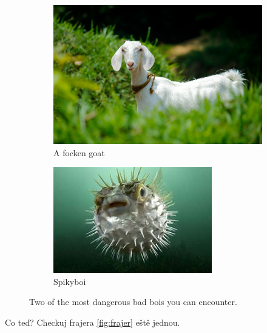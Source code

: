\documentclass{article}
\begin{document}
	\begin{figure}[h!]
		\centering
		\begin{subfigure}[b]{0.4\linewidth}
			\includegraphics[width=\linewidth]{images/goat.jpg}
			\caption{A focken goat}
		\end{subfigure}
		\begin{subfigure}[b]{0.4\linewidth}
			\includegraphics[width=\linewidth]{images/spikyboi.jpeg}
			\caption{Spikyboi}
		\end{subfigure}
		\caption{Two of the most dangerous bad bois you can encounter.}
		\label{fig:bois}
	\end{figure}
	Co teď? Checkuj frajera \ref{fig:frajer} eště jednou.
	
\end{document}
